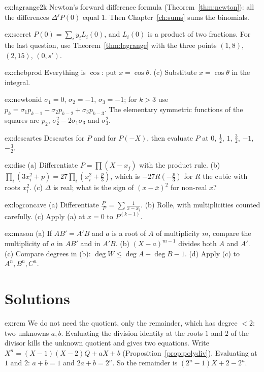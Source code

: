 \begin{hint}{ex:lagrange2k}
Newton's forward difference formula (Theorem~\ref{thm:newton}): all the differences $\Delta^jP(0)$ equal $1$. Then Chapter~\ref{ch:sums} sums the binomials.
\end{hint}
\begin{hint}{ex:secret}
$P(0)=\sum_iy_iL_i(0)$, and $L_i(0)$ is a product of two fractions. For the last question, use Theorem~\ref{thm:lagrange} with the three points $(1,8)$, $(2,15)$, $(0,s')$.
\end{hint}
\begin{hint}{ex:chebprod}
Everything is $\cos$: put $x=\cos\theta$. (c) Substitute $x=\cos\theta$ in the integral.
\end{hint}
\begin{hint}{ex:newtonid}
$\sigma_1=0$, $\sigma_2=-1$, $\sigma_3=-1$; for $k>3$ use $p_k=\sigma_1p_{k-1}-\sigma_2p_{k-2}+\sigma_3p_{k-3}$. The elementary symmetric functions of the squares are $p_2$, $\sigma_2^2-2\sigma_1\sigma_3$ and $\sigma_3^2$.
\end{hint}
\begin{hint}{ex:descartes}
Descartes for $P$ and for $P(-X)$, then evaluate $P$ at $0$, $\frac12$, $1$, $\frac32$, $-1$, $-\frac32$.
\end{hint}
\begin{hint}{ex:disc}
(a) Differentiate $P=\prod(X-x_j)$ with the product rule. (b) $\prod_i(3x_i^2+p)=27\prod_i(x_i^2+\frac p3)$, which is $-27R(-\frac p3)$ for $R$ the cubic with roots $x_i^2$. (c) $\Delta$ is real; what is the sign of $(x-\bar x)^2$ for non-real $x$?
\end{hint}
\begin{hint}{ex:logconcave}
(a) Differentiate $\frac{P'}P=\sum\frac1{x-x_i}$. (b) Rolle, with multiplicities counted carefully. (c) Apply (a) at $x=0$ to $P^{(k-1)}$.
\end{hint}
\begin{hint}{ex:mason}
(a) If $AB'=A'B$ and $a$ is a root of $A$ of multiplicity $m$, compare the multiplicity of $a$ in $AB'$ and in $A'B$. (b) $(X-a)^{m-1}$ divides both $A$ and $A'$. (c) Compare degrees in (b): $\deg W\le\deg A+\deg B-1$. (d) Apply (c) to $A^n,B^n,C^n$.
\end{hint}

\section{Solutions}

\begin{solution}{ex:rem}
\idea We do not need the quotient, only the remainder, which has degree $<2$: two unknowns $a,b$. Evaluating the division identity at the roots $1$ and $2$ of the divisor kills the unknown quotient and gives two equations.
\writeup Write $X^n=(X-1)(X-2)Q+aX+b$ (Proposition~\ref{prop:polydiv}). Evaluating at $1$ and $2$: $a+b=1$ and $2a+b=2^n$. So the remainder is $(2^n-1)X+2-2^n$.
\end{solution}

